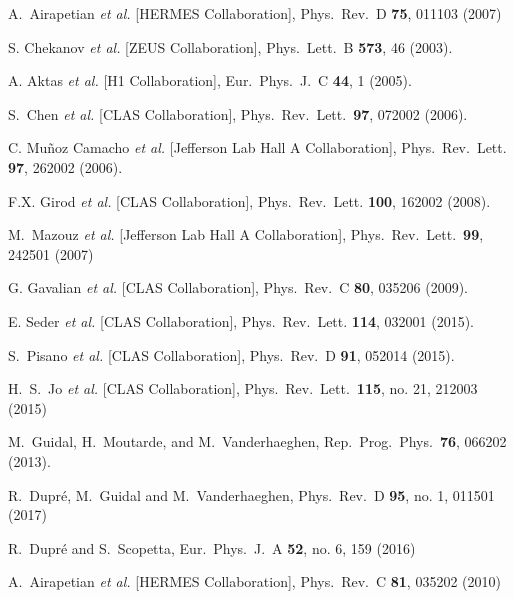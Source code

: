 \documentclass[twocolumn,nofootinbib,showpacs,prl,superscriptaddress,secnumarabic,amssymb,nobibnotes,aps,floatfix]{revtex4}
\begin{document}
\begin{thebibliography}{99}
 A.~Airapetian {\it et al.} [HERMES Collaboration],
Phys.\ Rev.\ D {\bf 75}, 011103 (2007)

S. Chekanov {\it et al.} [ZEUS Collaboration],
Phys.\ Lett.\  B {\bf 573}, 46 (2003).

A. Aktas {\it et al.} [H1 Collaboration],
Eur.\ Phys.\ J.\ C {\bf 44}, 1 (2005).

S.~Chen {\it et al.} [CLAS Collaboration],
Phys.\ Rev.\ Lett.\ {\bf 97}, 072002 (2006).

C. Mu\~noz Camacho {\it et al.} [Jefferson Lab Hall A Collaboration],
Phys.\ Rev.\ Lett. {\bf 97}, 262002 (2006).

F.X. Girod {\it et al.} [CLAS Collaboration],
Phys.\ Rev.\ Lett. {\bf 100}, 162002 (2008).

   M.~Mazouz {\it et al.} [Jefferson Lab Hall A Collaboration],
   Phys.\ Rev.\ Lett.\  {\bf 99}, 242501 (2007)

G. Gavalian {\it et al.} [CLAS Collaboration],
Phys.\ Rev.\ C {\bf 80}, 035206 (2009).

E. Seder {\it et al.} [CLAS Collaboration],
Phys.\ Rev.\ Lett. {\bf 114}, 032001 (2015).

S.~Pisano {\it et al.} [CLAS Collaboration],
Phys.\ Rev.\ D {\bf 91}, 052014 (2015).

 H.~S.~Jo {\it et al.} [CLAS Collaboration],
  Phys.\ Rev.\ Lett.\  {\bf 115}, no. 21, 212003 (2015)

 M.~Guidal, H.~Moutarde, and M.~Vanderhaeghen,
Rep.\ Prog.\ Phys.\  {\bf 76}, 066202 (2013).

 R.~Dupr\'{e}, M.~Guidal and M.~Vanderhaeghen,
 Phys.\ Rev.\ D {\bf 95}, no. 1, 011501 (2017)

  R.~Dupr\'e and S.~Scopetta,
  Eur.\ Phys.\ J.\ A {\bf 52}, no. 6, 159 (2016)

 A.~Airapetian {\it et al.} [HERMES Collaboration],
Phys.\ Rev.\ C {\bf 81}, 035202 (2010)


\end{thebibliography}
\end{document}
